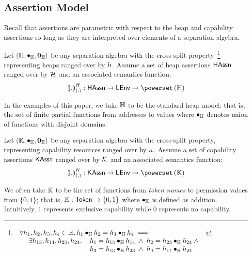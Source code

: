 \subsection{Assertion Model}
Recall that \colosl assertions are parametric with respect to the heap and capability assertions so long as they are interpreted over elements of a separation algebra. 
%
\begin{parameter}\label{par:heapSA}
Let $(\mathbb{H}, \bullet_{\mathbb{H}}, \mathbf{0}_{\mathbb{H}})$ be any separation algebra with the cross-split property~\cite{dockins2009fresh}\footnote{%
$	
\begin{array}[t]{l}
	\forall h_1, h_2, h_3, h_4 \in \mathbb{H}.\,
	h_1 \bullet_{\mathbb{H}} h_2 = h_3 \bullet_{\mathbb{H}} h_4 \implies \\
	\hspace*{0.3cm}	
	\begin{array}{l l}
		\exists h_{13}, h_{14}, h_{23}, h_{24}.\, &
		h_1 = h_{13} \bullet_{\mathbb{H}} h_{14} \;\land\; h_2 = h_{23} \bullet_{\mathbb{H}} h_{24} \;\land\\
		& h_3 = h_{13} \bullet_{\mathbb{H}} h_{23} \;\land\; h_4 = h_{14} \bullet_{\mathbb{H}} h_{24}
	\end{array}
\end{array}
$%
} representing heaps ranged over by $h_{}$. Assume a set of heap assertions $\textsf{HAssn}$ ranged over by $\mathcal{H}_{}$ and an associated semantics function:
%
\[
	\semH[\blankArg]{.} : \HAssertions \rightarrow \LEnv \rightarrow \pset{\Heaps}
\]
%
\end{parameter}
%
In the examples of this paper, we take $\mathbb{H}$ to be the standard heap model: that is, the set of finite partial functions from addresses to values where $\bullet_{\mathbb{H}}$ denotes union of functions with disjoint domains.
%
%
\begin{parameter}\label{par:capSA}
Let $\left(\mathbb{K}, \bullet_{\mathbb{K}}, \mathbf{0}_{\mathbb{K}}\right)$ be any separation algebra with the cross-split property, representing capability resources ranged over by $\kappa_{}$. Assume a set of capability assertions $\textsf{KAssn}$ ranged over by $\mathcal{K}_{}$ and an associated semantics function:
%
\[
	\semK[\blankArg]{.} : \KAssertions \rightarrow \LEnv \rightarrow \pset{\Caps}
\]
%
\end{parameter}
%
We often take $\mathbb{K}$ to be the set of functions from \emph{token names} to permission values from $\{0,1\}$; that is, $\mathbb{K}: \textsf{Token} \rightarrow \{0,1\}$ where $\bullet_{\mathbb{K}}$ is defined as addition. Intuitively, $1$ represents exclusive capability while $0$ represents no capability.
%

